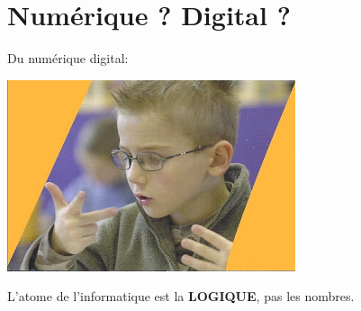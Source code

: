 \documentclass[french,handout]{beamer}
\begin{document}








\section{Numérique ? Digital ?}


\begin{frame}
    Du numérique digital:
  \begin{center}
    \includegraphics[height=.7\textheight]{./doigts.jpg}
  \end{center}



L'atome de l'informatique est la \textbf{LOGIQUE}, pas les nombres.
\end{frame}


\end{document}
